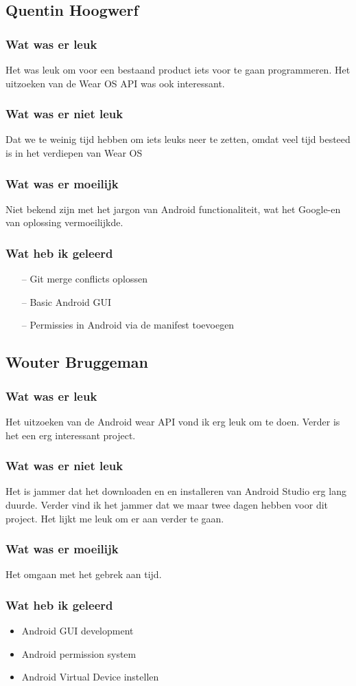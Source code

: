 \documentclass[../main.tex]{subfiles}
\begin{document}
\subsection{Quentin Hoogwerf}
\subsubsection{Wat was er leuk}
Het was leuk om voor een bestaand product iets voor te gaan programmeren. Het uitzoeken van de
Wear OS API was ook interessant.
\subsubsection{Wat was er niet leuk}
Dat we te weinig tijd hebben om iets leuks neer te zetten, omdat veel tijd besteed is in het verdiepen
van Wear OS
\subsubsection{Wat was er moeilijk}
Niet bekend zijn met het jargon van Android functionaliteit, wat het Google-en van oplossing
vermoeilijkde.
\subsubsection{Wat heb ik geleerd}
\begin{itemize}
	\item[--] Git merge conflicts oplossen
	\item[--] Basic Android GUI
	\item[--] Permissies in Android via de manifest toevoegen
\end{itemize}
\newpage

\subsection{Wouter Bruggeman}
\subsubsection{Wat was er leuk}
Het uitzoeken van de Android wear API vond ik erg leuk om te doen. Verder is het een erg
interessant project.
\subsubsection{Wat was er niet leuk}
Het is jammer dat het downloaden en en installeren van Android Studio erg lang duurde.
Verder vind ik het jammer dat we maar twee dagen hebben voor dit project. Het lijkt me leuk
om er aan verder te gaan.
\subsubsection{Wat was er moeilijk}
Het omgaan met het gebrek aan tijd.
\subsubsection{Wat heb ik geleerd}
\begin{itemize}
	\item Android GUI development
	\item Android permission system
	\item Android Virtual Device instellen
\end{itemize}
\newpage
\end{document}
